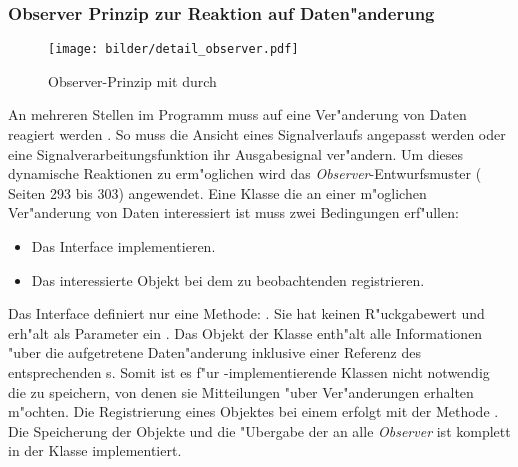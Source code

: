 
\subsubsection{Observer Prinzip zur Reaktion auf Daten"anderung}

\begin{figure}[bth]
\centering
\texttt{[image: bilder/detail\_observer.pdf]}
\caption{Observer-Prinzip mit durch }
\label{pic:observer}
\end{figure}

An mehreren Stellen im Programm muss auf eine Ver"anderung von Daten reagiert werden .
So muss die Ansicht eines Signalverlaufs angepasst werden oder eine Signalverarbeitungsfunktion ihr Ausgabesignal ver"andern.
Um dieses dynamische Reaktionen zu erm"oglichen wird das \emph{Observer}-Entwurfsmuster (\cite{Gamma1995} Seiten 293 bis 303) angewendet.
Eine Klasse die an einer m"oglichen Ver"anderung von Daten interessiert ist muss zwei Bedingungen erf"ullen:
\begin{itemize}
	\item Das Interface  implementieren.
	\item Das interessierte Objekt bei dem zu beobachtenden  registrieren.
\end{itemize}
Das Interface  definiert nur eine Methode: .
Sie hat keinen R"uckgabewert und erh"alt als Parameter ein .
Das Objekt der Klasse  enth"alt alle Informationen "uber die aufgetretene Daten"anderung inklusive einer Referenz des entsprechenden s.
Somit ist es f"ur -implementierende Klassen nicht notwendig die  zu speichern, von denen sie Mitteilungen "uber Ver"anderungen erhalten m"ochten.
Die Registrierung eines Objektes bei einem  erfolgt mit der Methode .
Die Speicherung der Objekte und die "Ubergabe der  an alle \emph{Observer} ist komplett in der Klasse  implementiert.

